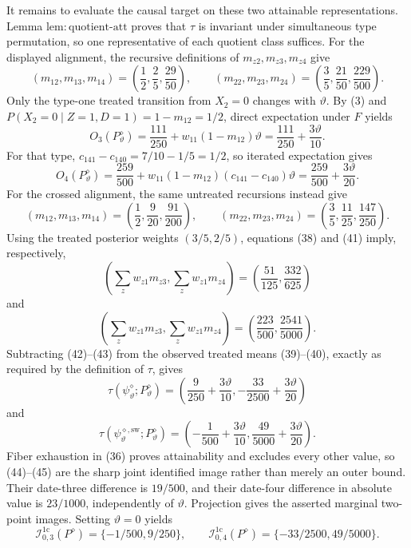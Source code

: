 It remains to evaluate the causal target on these two attainable representations.  Lemma \(\mathrm{lem{:}quotient\text{-}att}\) proves that \(\tau\) is invariant under simultaneous type permutation, so one representative of each quotient class suffices.  For the displayed alignment, the recursive definitions of \(m_{z2},m_{z3},m_{z4}\) give
\[
 (m_{12},m_{13},m_{14})=\left(\frac12,\frac25,\frac{29}{50}\right),
 \qquad
 (m_{22},m_{23},m_{24})=\left(\frac35,\frac{21}{50},\frac{229}{500}\right).
 \tag{38}
\]
Only the type-one treated transition from \(X_2=0\) changes with \(\vartheta\).  By (3) and \(P(X_2=0\mid Z=1,D=1)=1-m_{12}=1/2\), direct expectation under \(F\) yields
\[
 O_3(P^{\diamond}_{\vartheta})
 =\frac{111}{250}+w_{11}(1-m_{12})\vartheta
 =\frac{111}{250}+\frac{3\vartheta}{10}.
 \tag{39}
\]
For that type, \(c_{141}-c_{140}=7/10-1/5=1/2\), so iterated expectation gives
\[
 O_4(P^{\diamond}_{\vartheta})
 =\frac{259}{500}+w_{11}(1-m_{12})(c_{141}-c_{140})\vartheta
 =\frac{259}{500}+\frac{3\vartheta}{20}.
 \tag{40}
\]
For the crossed alignment, the same untreated recursions instead give
\[
 (m_{12},m_{13},m_{14})=\left(\frac12,\frac9{20},\frac{91}{200}\right),
 \qquad
 (m_{22},m_{23},m_{24})=\left(\frac35,\frac{11}{25},\frac{147}{250}\right).
 \tag{41}
\]
Using the treated posterior weights \((3/5,2/5)\), equations (38) and (41) imply, respectively,
\[
 \left(\sum_z w_{z1}m_{z3},\sum_z w_{z1}m_{z4}\right)
 =\left(\frac{51}{125},\frac{332}{625}\right)
 \tag{42}
\]
and
\[
 \left(\sum_z w_{z1}m_{z3},\sum_z w_{z1}m_{z4}\right)
 =\left(\frac{223}{500},\frac{2541}{5000}\right).
 \tag{43}
\]
Subtracting (42)--(43) from the observed treated means (39)--(40), exactly as required by the definition of \(\tau\), gives
\[
 \tau(\psi^{\diamond}_{\vartheta};P^{\diamond}_{\vartheta})
 =\left(\frac9{250}+\frac{3\vartheta}{10},
         -\frac{33}{2500}+\frac{3\vartheta}{20}\right)
 \tag{44}
\]
and
\[
 \tau(\psi^{\diamond,\mathrm{sw}}_{\vartheta};P^{\diamond}_{\vartheta})
 =\left(-\frac1{500}+\frac{3\vartheta}{10},
         \frac{49}{5000}+\frac{3\vartheta}{20}\right).
 \tag{45}
\]
Fiber exhaustion in (36) proves attainability and excludes every other value, so (44)--(45) are the sharp joint identified image rather than merely an outer bound.  Their date-three difference is \(19/500\), and their date-four difference in absolute value is \(23/1000\), independently of \(\vartheta\).  Projection gives the asserted marginal two-point images.  Setting \(\vartheta=0\) yields
\[
 \mathcal I_{0,3}^{1\mathrm c}(P^{\diamond})=\{-1/500,9/250\},
 \qquad
 \mathcal I_{0,4}^{1\mathrm c}(P^{\diamond})=\{-33/2500,49/5000\}.
 \tag{46}
\]

